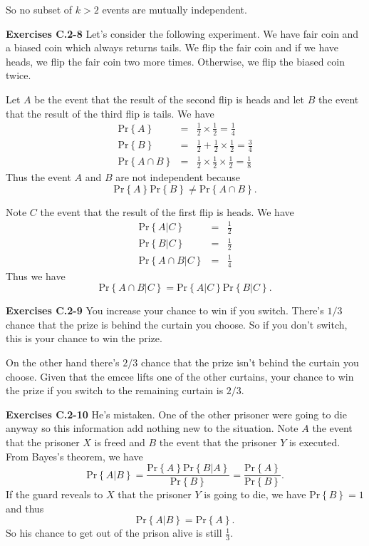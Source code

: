 \documentclass[a4paper,12pt]{article}
\newcommand{\newpar}[1]
{\bigskip \noindent \textbf{Exercises #1} \newline}
\newcommand{\prob}[1]{\mathrm{Pr}\left\{ #1 \right\}}
\begin{document}
So no subset of $k > 2$ events are mutually independent.

\newpar{C.2-8}
Let's consider the following experiment.  We have fair coin and a
biased coin which always returns tails.  We flip the fair coin and if
we have heads,  we flip the fair coin two more times.  Otherwise, we
flip the biased coin twice.

Let $A$ be the event that the result of the second flip is heads and
let $B$ the event that the result of the third flip is tails.  We
have
\begin{eqnarray*}
  \prob{A} &=& \frac{1}{2} \times \frac{1}{2} = \frac{1}{4} \\
  \prob{B} &=& \frac{1}{2} + \frac{1}{2}\times\frac{1}{2} =
  \frac{3}{4} \\
  \prob{A\cap B} &=& \frac{1}{2} \times \frac{1}{2} \times \frac{1}{2}
  = \frac{1}{8}
\end{eqnarray*}
Thus the event $A$ and $B$ are not independent because
\[\prob{A}\prob{B} \not= \prob{A\cap B}.\]

\medskip
Note $C$ the event that the result of the first flip is heads.  We
have
\begin{eqnarray*}
  \prob{A | C} &=& \frac{1}{2} \\
  \prob{B | C} &=& \frac{1}{2} \\
  \prob{A \cap B | C} &=& \frac{1}{4}
\end{eqnarray*}
Thus we have
\[ \prob{A\cap B | C} = \prob{A | C} \prob{B | C}.\]

\newpar{C.2-9}
You increase your chance to win if you switch.  There's $1/3$ chance
that the prize is behind the curtain you choose.  So if you don't
switch, this is your chance to win the prize.

On the other hand there's $2/3$ chance that the prize isn't behind the
curtain you choose.  Given that the emcee lifts one of the other curtains,
your chance to win the prize if you switch to the remaining curtain is
$2/3$.

\newpar{C.2-10} He's mistaken.  One of the other prisoner were going
to die anyway so this information add nothing new to the
situation.  Note $A$ the event that the prisoner $X$ is freed and $B$
the event that the prisoner $Y$ is executed.  From Bayes's theorem, we
have
\[ \prob{A | B} = \frac{\prob{A}\prob{B|A}}{\prob{B}} =
\frac{\prob{A}}{\prob{B}}.\]
If the guard reveals to $X$ that the prisoner $Y$ is going to die, we
have $\prob{B} = 1$ and thus
\[ \prob{A | B} = \prob{A}.\]
So his chance to get out of the prison alive is still $\frac{1}{3}$.
\end{document}
